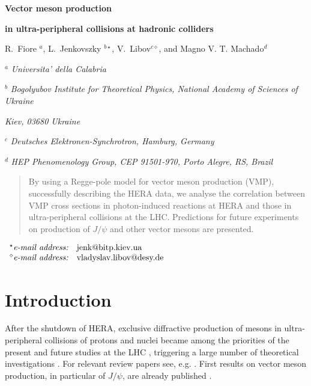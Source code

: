 \documentclass[12pt]{article}
\begin{document}
\vskip 0.5cm \centerline{\bf\Large Vector meson production}
\centerline{\bf\Large in ultra-peripheral collisions at hadronic colliders}  \vskip 0.3cm
\centerline{R.~Fiore $^a$, L.~Jenkovszky $^{b\star}$, V.~Libov$^{c\diamond}$, and Magno V. T. Machado$^d$}

\vskip 1cm

\centerline{$^a$ \sl Universita' della Calabria}
\centerline{$^b$ \sl Bogolyubov Institute for Theoretical Physics,
National Academy of Sciences of Ukraine} \centerline{\sl Kiev,
03680 Ukraine}
\centerline{$^c$ \sl Deutsches Elektronen-Synchrotron, Hamburg, Germany}
\centerline{$^d$ \sl HEP Phenomenology Group, CEP 91501-970, Porto Alegre, RS, Brazil
}
\vskip
0.1cm

\begin{abstract}\noindent
By using a Regge-pole model for vector meson production (VMP), successfully describing the HERA data, we analyse the correlation between VMP cross sections in photon-induced reactions at HERA and those in ultra-peripheral collisions at the LHC.
Predictions for future experiments on production of $J/\psi$ and other vector mesons are presented.
\end{abstract}

\vskip 0.1cm

$
\begin{array}{ll}

^{\star}\mbox{{\it e-mail address:}} &
   \mbox{jenk@bitp.kiev.ua} \\
^{\diamond}\mbox{{\it e-mail address:}} &
   \mbox{vladyslav.libov@desy.de} \\

\end{array}
$


\section{Introduction}\label{Int}

After the shutdown of HERA, exclusive diffractive production of mesons in ultra-peripheral collisions of protons and nuclei became among the priorities of the present and future studies at the LHC \cite{LHCb1, LHCb2}, triggering a large number of theoretical investigations \cite{Schafer, Brazil, Ryskin, Motyka, Szczurek, Recent}.
For relevant review papers see, e.g. \cite{Review}.
First results on vector meson production, in particular of $J/\psi$, are already published \cite{LHCb1, LHCb2}.
\end{document}
